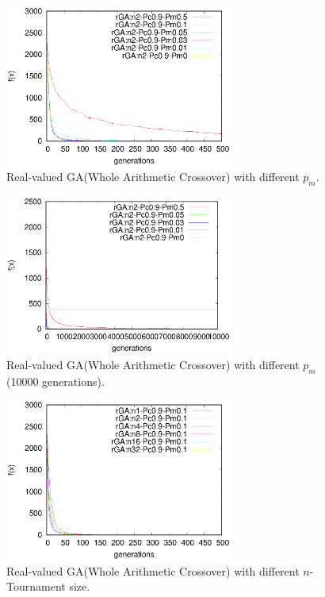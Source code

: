 ﻿\documentclass[conference]{IEEEtran}
\begin{document}
\begin{CJK}{UTF8}{bsmi}
\begin{figure}[htbp]
\centerline{\includegraphics[width=7.5cm]{fig/rGA/change_pm_whole.eps}}
\caption{Real-valued GA(Whole Arithmetic Crossover) with different $p_{m}$.}
\label{fig}
\end{figure}

\begin{figure}[htbp]
\centerline{\includegraphics[width=7.5cm]{fig/rGA/change_pm_whole10000.eps}}
\caption{Real-valued GA(Whole Arithmetic Crossover) with different $p_{m}$ (10000 generations).}
\label{fig}
\end{figure}

\begin{figure}[htbp]
\centerline{\includegraphics[width=7.5cm]{fig/rGA/change_n_whold.eps}}
\caption{Real-valued GA(Whole Arithmetic Crossover) with different $n$-Tournament size.}
\label{fig}
\end{figure}


\end{CJK}
\end{document}
